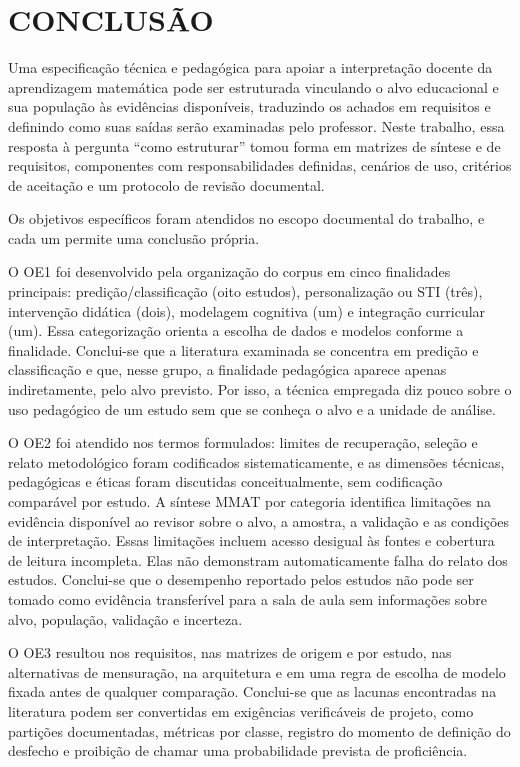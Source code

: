 \chapter{CONCLUSÃO}
\label{cap:conclusao}

Uma especificação técnica e pedagógica para apoiar a interpretação docente da aprendizagem matemática pode ser estruturada vinculando o alvo educacional e sua população às evidências disponíveis, traduzindo os achados em requisitos e definindo como suas saídas serão examinadas pelo professor. Neste trabalho, essa resposta à pergunta ``como estruturar'' tomou forma em matrizes de síntese e de requisitos, componentes com responsabilidades definidas, cenários de uso, critérios de aceitação e um protocolo de revisão documental.

Os objetivos específicos foram atendidos no escopo documental do trabalho, e cada um permite uma conclusão própria.

O OE1 foi desenvolvido pela organização do corpus em cinco finalidades principais: predição/classificação (oito estudos), personalização ou STI (três), intervenção didática (dois), modelagem cognitiva (um) e integração curricular (um). Essa categorização orienta a escolha de dados e modelos conforme a finalidade. Conclui-se que a literatura examinada se concentra em predição e classificação e que, nesse grupo, a finalidade pedagógica aparece apenas indiretamente, pelo alvo previsto. Por isso, a técnica empregada diz pouco sobre o uso pedagógico de um estudo sem que se conheça o alvo e a unidade de análise.

O OE2 foi atendido nos termos formulados: limites de recuperação, seleção e relato metodológico foram codificados sistematicamente, e as dimensões técnicas, pedagógicas e éticas foram discutidas conceitualmente, sem codificação comparável por estudo. A síntese MMAT por categoria identifica limitações na evidência disponível ao revisor sobre o alvo, a amostra, a validação e as condições de interpretação. Essas limitações incluem acesso desigual às fontes e cobertura de leitura incompleta. Elas não demonstram automaticamente falha do relato dos estudos. Conclui-se que o desempenho reportado pelos estudos não pode ser tomado como evidência transferível para a sala de aula sem informações sobre alvo, população, validação e incerteza.

O OE3 resultou nos requisitos, nas matrizes de origem e por estudo, nas alternativas de mensuração, na arquitetura e em uma regra de escolha de modelo fixada antes de qualquer comparação. Conclui-se que as lacunas encontradas na literatura podem ser convertidas em exigências verificáveis de projeto, como partições documentadas, métricas por classe, registro do momento de definição do desfecho e proibição de chamar uma probabilidade prevista de proficiência.


